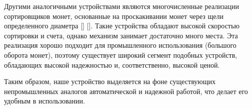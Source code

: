 Другими аналогичными устройствами являются многочисленные реализации сортировщиков монет, основанные на проскакивании монет через щели определенного диаметра [] []. Такие устройства обладают высокой скоростью сортировки и счета, однако механизм занимает достаточно много места. Эта реализация хорошо подходит для промышленного использования (большого оборота монет), поэтому существует широкий сегмент подобных устройств, обладающих высокой надежностью и, соответственно, высокой ценой. 

Таким образом, наше устройство выделяется на фоне существующих непромышленных аналогов автоматической и надежной работой, что делает его удобным в использовании.



